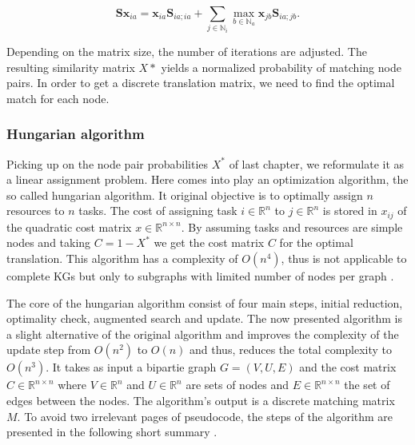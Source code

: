 {{\begin{equation}
    \mathbf{Sx}_{i a}=\mathbf{x}_{i a} \mathbf{S}_{i a ; i a}+\sum_{j \in \mathbb{N}_{i}} \max _{b \in \mathbb{N}_{a}} \mathbf{x}_{j b} \mathbf{S}_{i a ; j b}.
\end{equation}

Depending on the matrix size, the number of iterations are adjusted. The resulting similarity matrix $X*$ yields a normalized probability of matching node pairs. In order to get a discrete translation matrix, we need to find the optimal match for each node.



\subsubsection{Hungarian algorithm}
\label{ssec3:hung}

Picking up on the node pair probabilities $X^*$ of last chapter, we reformulate it as a linear assignment problem. Here comes into play an optimization algorithm, the so called hungarian algorithm. It original objective is to optimally assign $n$ resources to $n$ tasks. The cost of assigning task $i \in \mathbb{R}^n$ to $j \in \mathbb{R}^n$ is stored in $x_{ij}$ of the quadratic cost matrix $x \in \mathbb{R}^{n \times n}$. By assuming tasks and resources are simple nodes and taking $C=1-X^*$ we get the cost matrix $C$ for the optimal translation. This algorithm has a complexity of $O\left(n^{4}\right)$, thus is not applicable to complete KGs but only to subgraphs with limited number of nodes per graph \cite{date_gpu-accelerated_2016}.

The core of the hungarian algorithm consist of four main steps, initial reduction, optimality check, augmented search and update. The now presented algorithm is a slight alternative of the original algorithm and improves the complexity of the update step from $O\left(n^{2}\right)$ to $O\left(n\right)$ and thus, reduces the total complexity to $O\left(n^{3}\right)$. It takes as input a bipartie graph $G=(V, U, E)$ and the cost matrix $C \in \mathbb{R}^{n \times n}$ where $V \in \mathbb{R}^n$ and $U \in \mathbb{R}^n$ are sets of nodes and $E \in \mathbb{R}^{n \times n}$ the set of edges between the nodes. The algorithm's output is a discrete matching matrix $M$. To avoid two irrelevant pages of pseudocode, the steps of the algorithm are presented in the following short summary \cite{mills-tettey_dynamic_nodate}.

}}
